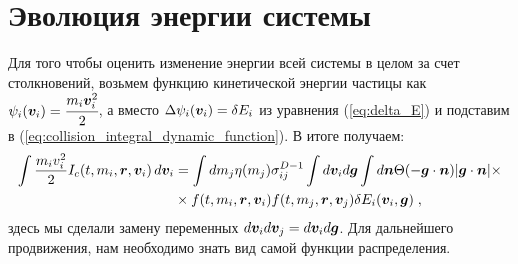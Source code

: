 \section{Эволюция энергии системы}
Для того чтобы оценить изменение энергии всей системы в целом за счет столкновений, возьмем функцию кинетической энергии
частицы как $\psi_i(\bm{v}_i) = \cfrac{m_i\bm{v}^2_i}{2}$, а вместо $\Delta\psi_i(\bm{v}_i)=\delta E_i$ из уравнения (\ref{eq:delta_E}) и подставим
в (\ref{eq:collision_integral_dynamic_function}). В итоге получаем:
\begin{equation}
  \begin{split}
    \int\frac{m_iv^2_i}{2}I_c(t,m_i,\bm{r},\bm{v}_i)\,d\bm{v}_i &= \int dm_j\eta(m_j)\sigma^{D-1}_{ij}
    \int d\bm{v}_id\bm{g}\int d\bm{n}\Theta(-\bm{g}\cdot\bm{n})\vert\bm{g}\cdot\bm{n}\vert\times\\
    &\times f(t,m_i,\bm{r},\bm{v}_i)f(t,m_j,\bm{r},\bm{v}_j)\delta E_i(\bm{v}_i,\bm{g})\;,
  \end{split}
\end{equation}
здесь мы сделали замену переменных $d\bm{v}_id\bm{v}_j=d\bm{v}_id\bm{g}$. Для дальнейшего продвижения, нам необходимо знать вид самой функции распределения.

